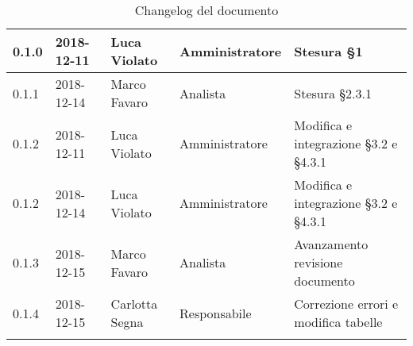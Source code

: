 \begin{center}
\begin{longtable}[c]{|m{}|m{}|m{}|m{}|p{}|}
\hline
\rowcolor{grigio}0.1.0 & 2018-12-11 & Luca Violato & Amministratore & Stesura §1\\
\hline
0.1.1 & 2018-12-14 & Marco Favaro & Analista & Stesura §2.3.1\\
\hline
\rowcolor{grigio}0.1.2 & 2018-12-11 & Luca Violato & Amministratore & Modifica e integrazione §3.2 e §4.3.1\\
\hline
0.1.2 & 2018-12-14 & Luca Violato & Amministratore & Modifica e integrazione §3.2 e §4.3.1\\
\hline
\rowcolor{grigio}0.1.3 & 2018-12-15 & Marco Favaro & Analista & Avanzamento revisione documento\\
\hline
0.1.4 & 2018-12-15 & Carlotta Segna & Responsabile & Correzione errori e modifica tabelle \\
\caption{Changelog del documento}
\end{longtable}
\end{center}